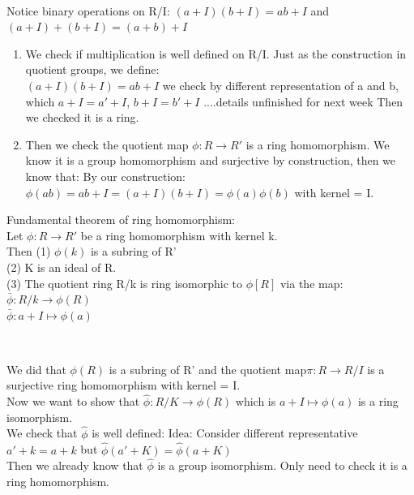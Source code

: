\documentclass{article}
\begin{document}
\begin{Proof}
\hfill
\\Notice binary operations on R/I: $(a+I)(b+I) = ab + I$ and $(a+I)+(b+I) = (a+b) + I$
\begin{enumerate}
 \item We check if multiplication is well defined on R/I. Just as the construction in quotient groups, we define:
\\ 
\textbf{$(a+I)(b+I) = ab + I$ }
we check by different representation of a and b, which $a+I =a'+I$, $b+I = b'+I$
....details unfinished for next week 
Then we checked it is a ring.
\item Then we check the quotient map $\phi: R \rightarrow R'$ is a ring homomorphism. We know it is a group homomorphism and surjective by construction, then we know that:
By our construction: $\phi(ab) = ab + I = (a+I)(b+I) = \phi(a) \phi(b)$ with kernel = I.

\end{enumerate}


\end{Proof}


\begin{theorem}
    Fundamental theorem of ring homomorphism:
    \\Let $\phi:R \rightarrow R'$ be a ring homomorphism with kernel k. 
    \\Then (1) $\phi(k)$ is a subring of R'
    \\(2) K is an ideal of R.
    \\(3) The quotient ring R/k is ring isomorphic to $\phi [R]$ via the map:
    \\$\bar{\phi}: R/k \rightarrow \phi(R)$
    \\$\bar{\phi}: a+I \mapsto \phi(a)$
\end{theorem}\

\begin{Proof}
    We did that $\phi(R)$ is a subring of R' and the quotient map$\pi: R \rightarrow R/I$ is a surjective ring homomorphism with kernel = I.
    \\Now we want to show that $\hat{\phi}: R/K \rightarrow \phi(R)$ which is $a+I \mapsto \phi(a)$ is a ring isomorphism.
    \\We check that $\hat{\phi}$ is well defined:
    Idea: Consider different representative $a'+k = a+k $ but  $\hat{\phi}(a'+K) = \hat{\phi}(a+K)$
    \\ Then we already know that $\hat{\phi}$ is a group isomorphism. Only need to check it is a ring homomorphism.
\end{Proof}
\end{document}
